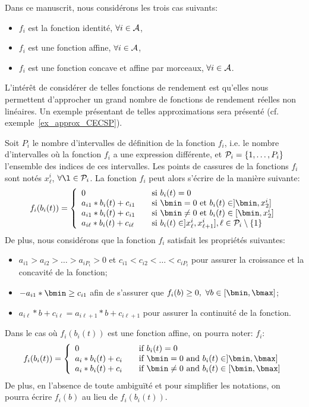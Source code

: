 Dans ce manuscrit, nous considérons les trois cas suivants:
\begin{itemize}
\item $f_i$ est la fonction identité, $\forall i \in \A$,
\item $f_i$ est une fonction affine, $\forall i \in \A$,
\item $f_i$ est une fonction concave et affine par morceaux, $\forall
  i \in \A$.
\end{itemize}

L'intérêt de considérer de telles fonctions de rendement est qu'elles
nous permettent d'approcher un grand nombre de fonctions de
rendement réelles non linéaires. Un exemple présentant de telles
approximations sera présenté (cf. exemple~\ref{ex_approx_CECSP}). 


Soit $P_i$ le nombre d'intervalles de définition de la fonction $f_i$,
i.e. le nombre d'intervalles où la fonction $f_i$ a une expression
différente, et $\P_i=\{1,\dots,P_i\}$ l'ensemble des indices de ces
intervalles. Les points de cassures de la fonctions $f_i$ sont notés
$x_\ell^i$, $\forall \l \in \P_i$. La fonction $f_i$ peut alors
s'écrire de la manière suivante: 
\[f_i(b_i(t))=\left\{
    \begin{array}{ll}
      0 & \quad \text{si }b_i(t)=0\\
      a_{i1}*b_i(t)+c_{i1} &\quad \text{si }\bmin=0\text{ et }b_i(t) \in ]\bmin,x_{2}^i] \\
      a_{i1}*b_i(t)+c_{i1} &\quad \text{si }\bmin\neq 0 \text{ et }b_i(t) \in
                            [\bmin,x_{2}^i] \\
      a_{i\ell}*b_i(t)+c_{i\ell} &\quad \text{si } b_i(t) \in
                                  ]x_{\ell}^i,x_{\ell+1}^i], \ell \in \P_i\setminus\{1\}
    \end{array}
  \right.\]
De plus, nous considérons que la fonction $f_i$ satisfait les
propriétés suivantes: 
\begin{itemize}
\item $a_{i1} >a_{i2} > \dots > a_{iP_i}>0$ et $c_{i1}
  <c_{i2} < \dots < c_{iP_i}$ pour assurer la croissance et la
  concavité de la fonction; 
\item $-a_{i1}*\bmin \ge c_{i1}$  afin de s'assurer que $f_i(b) \ge
  0,\ \forall b \in [\bmin,\bmax]$;
\item $a_{i\ell}*b+c_{i\ell}=a_{i\ell+1}*b+c_{i\ell+1}$
  pour assurer la continuité de la fonction.
\end{itemize}
Dans le cas où $f_i(b_i(t))$ est une fonction affine, on pourra noter:
$f_i$:
\[f_i(b_i(t))=\left\{
\begin{array}{ll}
  0 & \quad \text{if }b_i(t)=0\\
  a_i*b_i(t)+c_i &\quad \text{if }\bmin=0\text{ and }b_i(t) \in ]\bmin,\bmax] \\
  a_i*b_i(t)+c_i &\quad \text{if }\bmin\neq 0 \text{ and }b_i(t) \in [\bmin,\bmax]
\end{array}
\right.
\]
De plus, en l'absence de toute ambiguïté et pour simplifier les
notations, on pourra écrire $f_i(b)$ au lieu de $f_i(b_i(t))$.

